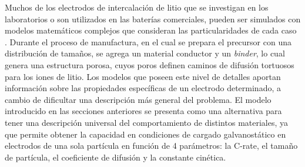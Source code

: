 Muchos de los electrodos de intercalación de litio que se investigan en los 
laboratorios o son utilizados en las baterías comerciales, pueden ser simulados
con modelos matemáticos complejos que consideran las particularidades de cada
caso \cite{doyle1995}. Durante el proceso de manufactura, en el cual se prepara
el precursor con una distribución de tamaños, se agrega un material conductor y
un \textit{binder}, lo cual genera una estructura porosa, cuyos poros definen
caminos de difusión tortuosos para los iones de litio. Los modelos que poseen
este nivel de detalles \cite{doyle1995} aportan información sobre las propiedades
específicas de un electrodo determinado, a cambio de dificultar una descripción
más general del problema. El modelo introducido en las secciones anteriores 
se presenta como una alternativa para tener una descripción universal del 
comportamiento de distintos materiales, ya que permite obtener la capacidad en 
condiciones de cargado galvanostático en electrodos de una sola partícula en 
función de 4 parámetros: la C-rate, el tamaño de partícula, el coeficiente de 
difusión y la constante cinética.

